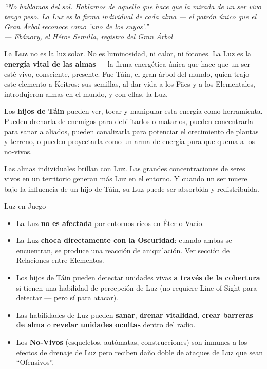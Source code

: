 \begin{tcolorbox}[enhanced, colback=DeepBlack!80, colframe=GoldRule!60,
    title={\color{GoldRule!90}\textbf{LA LUZ}},
    fonttitle=\large\bfseries,
    attach boxed title to top left={xshift=4mm, yshift=-2mm},
    boxed title style={colback=DeepBlack, colframe=GoldRule!60}]
    \color{white}
    \itshape
    ``No hablamos del sol. Hablamos de aquello que hace que la mirada de un ser vivo tenga peso. La Luz es la firma individual de cada alma — el patrón único que el Gran Árbol reconoce como 'uno de los suyos'.''\\[4pt]
    \hfill — \textit{Ebánory, el Héroe Semilla, registro del Gran Árbol}
\end{tcolorbox}

\vspace{0.3cm}

La \textbf{Luz} no es la luz solar. No es luminosidad, ni calor, ni fotones. La Luz es la \textbf{energía vital de las almas} — la firma energética única que hace que un ser esté vivo, consciente, presente. Fue Táin, el gran árbol del mundo, quien trajo este elemento a Keitros: sus semillas, al dar vida a los Fäes y a los Elementales, introdujeron almas en el mundo, y con ellas, la Luz.

Los \textbf{hijos de Táin} pueden ver, tocar y manipular esta energía como herramienta. Pueden drenarla de enemigos para debilitarlos o matarlos, pueden concentrarla para sanar a aliados, pueden canalizarla para potenciar el crecimiento de plantas y terreno, o pueden proyectarla como un arma de energía pura que quema a los no-vivos.

Las almas individuales brillan con Luz. Las grandes concentraciones de seres vivos en un territorio generan más Luz en el entorno. Y cuando un ser muere bajo la influencia de un hijo de Táin, su Luz puede ser absorbida y redistribuida.

\begin{reglaespecial}{Luz en Juego}
\begin{itemize}
    \item La Luz \textbf{no es afectada} por entornos ricos en Éter o Vacío.
    \item La Luz \textbf{choca directamente con la Oscuridad}: cuando ambas se encuentran, se produce una reacción de aniquilación. Ver sección de Relaciones entre Elementos.
    \item Los hijos de Táin pueden detectar unidades vivas \textbf{a través de la cobertura} si tienen una habilidad de percepción de Luz (no requiere Line of Sight para detectar — pero sí para atacar).
    \item Las habilidades de Luz pueden \textbf{sanar}, \textbf{drenar vitalidad}, \textbf{crear barreras de alma} o \textbf{revelar unidades ocultas} dentro del radio.
    \item Los \textbf{No-Vivos} (esqueletos, autómatas, construcciones) son inmunes a los efectos de drenaje de Luz pero reciben daño doble de ataques de Luz que sean ``Ofensivos''.
\end{itemize}
\end{reglaespecial}

